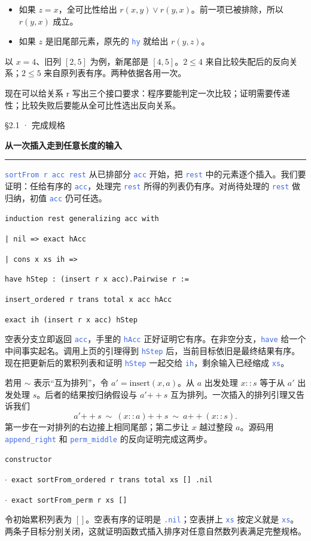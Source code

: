 \documentclass[UTF8,11pt,a4paper,fontset=fandol]{ctexart}
\newcommand{\HandoutLesson}[2]{%
  \par{\small\heiti\color{BrickRed}#1}\par\vspace{3pt}
  {\fontsize{21}{27}\selectfont\heiti\bfseries #2}\par
  \textcolor{BrickRed}{\rule{\linewidth}{.7pt}}\par}
\newcommand{\HandoutBox}[1]{%
  \par\noindent\begingroup\setlength{\fboxsep}{8pt}%
  \colorbox{BrickRed!9}{\parbox{\dimexpr\linewidth-16pt\relax}{#1}}\endgroup\par}
\newcommand{\src}[1]{\textcolor{RoyalBlue}{\texttt{#1}}}
\newcommand{\subhead}[1]{\par\vspace{3pt}{\heiti\bfseries\color{RoyalBlue}#1}\par}
\newenvironment{leanblock}{\par\smallskip\noindent\begin{lrbox}{\leanbox}\begin{minipage}{\dimexpr\linewidth-12pt\relax}\raggedright\small\setlength{\parskip}{0pt}}{\end{minipage}\end{lrbox}\colorbox{RoyalBlue!6}{\usebox{\leanbox}}\par\smallskip}
\newcommand{\lineofcode}[2]{\noindent\hspace*{#1em}\strut\texttt{#2}\par}
\begin{document}
\begin{itemize}
\item 如果 $z=x$，全可比性给出 $r(x,y)\lor r(y,x)$。前一项已被排除，所以 $r(y,x)$ 成立。
\item 如果 $z$ 是旧尾部元素，原先的 \src{hy} 就给出 $r(y,z)$。
\end{itemize}
以 $x=4$、旧列 $[2,5]$ 为例，新尾部是 $[4,5]$。$2\le4$ 来自比较失配后的反向关系；$2\le5$ 来自原列表有序。两种依据各用一次。
\HandoutBox{现在可以给关系 r 写出三个接口要求：程序要能判定一次比较；证明需要传递性；比较失败后要能从全可比性选出反向关系。}
\par{}
\clearpage{}\label{p14}\HandoutLesson{§2.1 · 完成规格}{从一次插入走到任意长度的输入}
\src{sortFrom r acc rest} 从已排部分 \src{acc} 开始，把 \src{rest} 中的元素逐个插入。我们要证明：任给有序的 \src{acc}，处理完 \src{rest} 所得的列表仍有序。对尚待处理的 \src{rest} 做归纳，初值 \src{acc} 仍可任选。
\begin{leanblock}
\lineofcode{1.0}{induction rest generalizing acc with}
\lineofcode{1.0}{| nil => exact hAcc}
\lineofcode{1.0}{| cons x xs ih =>}
\lineofcode{2.0}{have hStep : (insert r x acc).Pairwise r :=}
\lineofcode{3.0}{insert\_ordered r trans total x acc hAcc}
\lineofcode{2.0}{exact ih (insert r x acc) hStep}
\end{leanblock}
空表分支立即返回 \src{acc}，手里的 \src{hAcc} 正好证明它有序。在非空分支，\src{have} 给一个中间事实起名。调用上页的引理得到 \src{hStep} 后，当前目标依旧是最终结果有序。现在把更新后的累积列表和证明 \src{hStep} 一起交给 \src{ih}，剩余输入已经缩成 \src{xs}。
\subhead{另一条归纳线怎样保持全部元素}
若用 $\sim$ 表示“互为排列”，令 $a'=\mathrm{insert}(x,a)$。从 $a$ 出发处理 $x::s$ 等于从 $a'$ 出发处理 $s$。后者的结果按归纳假设与 $a'\mathbin{++}s$ 互为排列。一次插入的排列引理又告诉我们
\[
 a'\mathbin{++}s\ \sim\ (x::a)\mathbin{++}s\
 \sim\ a\mathbin{++}(x::s).
\]
第一步在一对排列的右边接上相同尾部；第二步让 $x$ 越过整段 $a$。源码用 \src{append\_right} 和 \src{perm\_middle} 的反向证明完成这两步。
\subhead{回到最外层的入口}
\begin{leanblock}
\lineofcode{1.0}{constructor}
\lineofcode{1.0}{\ensuremath{\cdot} exact sortFrom\_ordered r trans total xs [] .nil}
\lineofcode{1.0}{\ensuremath{\cdot} exact sortFrom\_perm r xs []}
\end{leanblock}
令初始累积列表为 $[]$。空表有序的证明是 \src{.nil}；空表拼上 \src{xs} 按定义就是 \src{xs}。两条子目标分别关闭，这就证明函数式插入排序对任意自然数列表满足完整规格。
\end{document}
